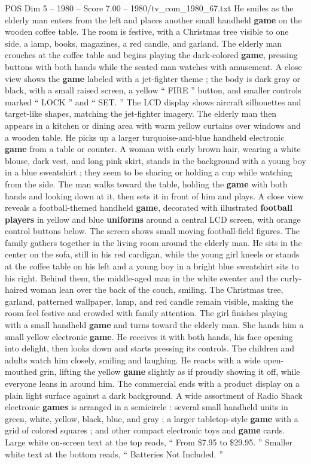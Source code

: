 \begin{textsample}{POS Dim 5 – 1980 – Score 7.00 – 1980/tv\_com\_1980\_67.txt}
He smiles as the elderly man enters from the left and places another small handheld \textbf{game} on the wooden coffee table.
The room is festive, with a Christmas tree visible to one side, a lamp, books, magazines, a red candle, and garland.
The elderly man crouches at the coffee table and begins playing the dark-colored \textbf{game}, pressing buttons with both hands while the seated man watches with amusement.
A close view shows the \textbf{game} labeled with a jet-fighter theme ; the body is dark gray or black, with a small raised screen, a yellow “ FIRE ” button, and smaller controls marked “ LOCK ” and “ SET. ” The LCD display shows aircraft silhouettes and target-like shapes, matching the jet-fighter imagery.
The elderly man then appears in a kitchen or dining area with warm yellow curtains over windows and a wooden table.
He picks up a larger turquoise-and-blue handheld electronic \textbf{game} from a table or counter.
A woman with curly brown hair, wearing a white blouse, dark vest, and long pink skirt, stands in the background with a young boy in a blue sweatshirt ; they seem to be sharing or holding a cup while watching from the side.
The man walks toward the table, holding the \textbf{game} with both hands and looking down at it, then sets it in front of him and plays.
A close view reveals a football-themed handheld \textbf{game}, decorated with illustrated \textbf{football} \textbf{players} in yellow and blue \textbf{uniforms} around a central LCD screen, with orange control buttons below.
The screen shows small moving football-field figures.
The family gathers together in the living room around the elderly man.
He sits in the center on the sofa, still in his red cardigan, while the young girl kneels or stands at the coffee table on his left and a young boy in a bright blue sweatshirt sits to his right.
Behind them, the middle-aged man in the white sweater and the curly-haired woman lean over the back of the couch, smiling.
The Christmas tree, garland, patterned wallpaper, lamp, and red candle remain visible, making the room feel festive and crowded with family attention.
The girl finishes playing with a small handheld \textbf{game} and turns toward the elderly man.
She hands him a small yellow electronic \textbf{game}.
He receives it with both hands, his face opening into delight, then looks down and starts pressing its controls.
The children and adults watch him closely, smiling and laughing.
He reacts with a wide open-mouthed grin, lifting the yellow \textbf{game} slightly as if proudly showing it off, while everyone leans in around him.
The commercial ends with a product display on a plain light surface against a dark background.
A wide assortment of Radio Shack electronic \textbf{games} is arranged in a semicircle : several small handheld units in green, white, yellow, black, blue, and gray ; a larger tabletop-style \textbf{game} with a grid of colored squares ; and other compact electronic toys and \textbf{game} cards.
Large white on-screen text at the top reads, “ From \$7.95 to \$29.95. ” Smaller white text at the bottom reads, “ Batteries Not Included. ”

\end{textsample}
